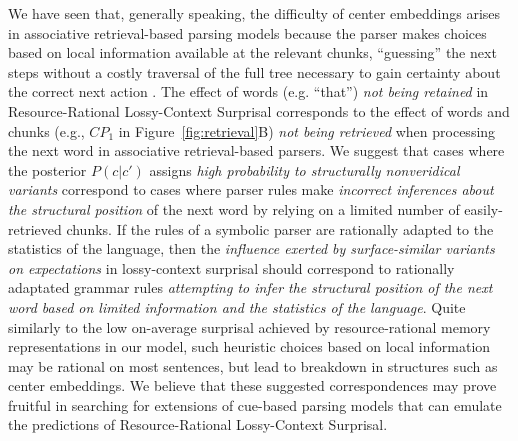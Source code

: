 We have seen that, generally speaking, the difficulty of center embeddings arises in associative retrieval-based parsing models because the parser makes choices based on local information available at the relevant chunks, ``guessing'' the next steps without a costly traversal of the full tree necessary to gain certainty about the correct next action \citep{mcelree-memory-2003,lewis2005activation,Haussler2015AnIA}.
The effect of words (e.g. ``that'') \emph{not being retained} in Resource-Rational Lossy-Context Surprisal corresponds to the effect of words and chunks (e.g., $CP_1$ in Figure~\ref{fig:retrieval}B) \emph{not being retrieved} when processing the next word in associative retrieval-based parsers.
We suggest that cases where the posterior $P(c|c')$ assigns \emph{high probability to structurally nonveridical variants} correspond to cases where parser rules make \emph{incorrect inferences about the structural position} of the next word by relying on a limited number of easily-retrieved chunks.
If the rules of a symbolic parser are rationally adapted to the statistics of the language, then the \emph{influence exerted by surface-similar variants on expectations} in lossy-context surprisal should correspond to rationally adaptated grammar rules \emph{attempting to infer the structural position of the next word based on limited information and the statistics of the language}.
Quite similarly to the low on-average surprisal achieved by resource-rational memory representations in our model, such heuristic choices based on local information may be rational on most sentences, but lead to breakdown in structures such as center embeddings.
We believe that these suggested correspondences may prove fruitful in searching for extensions of cue-based parsing models that can emulate the predictions of Resource-Rational Lossy-Context Surprisal.

